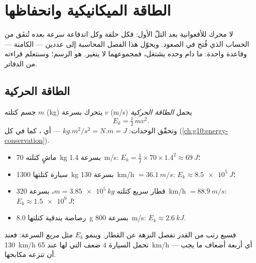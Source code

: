 \chapter{الطاقة الميكانيكية وانحفاظها}\label{ch:g11:mechanical-energy}

لا محرك للأفعوانية بعد التلّ الأول: فكل حلقة وكل اندفاعة
سرعة بعده تُنفَق من الحساب الذي فُتح في الصعود.
ويحوّل هذا الفصل المحاسبة إلى عددين ---  
الكامنة --- وقاعدة واحدة: ما دام  وحده يشتغل، فمجموعهما
لا يتغير.  هو الرسم؛ وسنتعلم قراءته من
الدفاتر.

\section{الطاقة الحركية}

\begin{definition}\label{def:g11:mechanical-energy:kinetic}
جسم كتلته $m$ (\unit{kg}) يتحرك بسرعة $v$ (\unit{m/s}) يحمل
\emph{الطاقة الحركية}
\[
E_k = \tfrac12\, m v^2 .
\]
وتحقّق الوحدات: $\unit{kg.m^2/s^2} = \unit{N.m} = \unit{J}$ --- أي ،
كما في كل  (\cref{ch:g10:energy-conservation}).
\end{definition}

\begin{example}\label{ex:g11:mechanical-energy:orders}
\begin{itemize}
  \item ماشٍ كتلته \qty{70}{kg} بسرعة \qty{1.4}{m/s}:
        $E_k = \tfrac12 \times 70 \times 1.4^2 \approx \qty{69}{J}$؛
  \item سيارة كتلتها \qty{1300}{kg} بسرعة \qty{130}{km/h} $= \qty{36.1}{m/s}$:
        $E_k \approx \qty{8.5e5}{J}$؛
  \item قطار سريع كتلته $m = \qty{3.85e5}{kg}$، بسرعة \qty{320}{km/h}
        $= \qty{88.9}{m/s}$: $E_k \approx \qty{1.5e9}{J}$؛
  \item رصاصة بندقية كتلتها \qty{8.0}{g} بسرعة \qty{800}{m/s}: $E_k \approx \qty{2.6}{kJ}$.
\end{itemize}
فسبع رتب من القدر تفصل النزهة عن القطار. وينمو $E_k$
مثل \emph{مربع} السرعة: فعند \qty{130}{km/h} تحمل السيارة
$4$ ضعف  التي لها عند \qty{65}{km/h} --- أي أربعة أضعاف
ما يجب أن تنزعه مكابحها.
\end{example}

